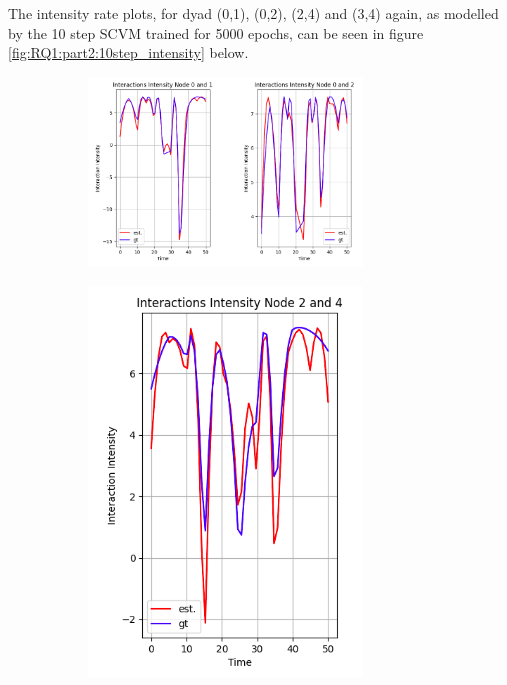 The intensity rate plots, for dyad (0,1), (0,2), (2,4) and (3,4) again, as modelled by the 10 step SCVM trained for 5000 epochs, can be seen in figure \ref{fig:RQ1:part2:10step_intensity} below.
\begin{figure}[H]
    \centering
    \begin{subfigure}[b]{0.9\textwidth}
        \centering
        \includegraphics[width=0.8\textwidth]{0_images/rq1_10step_SCVM_intensity1.png}
    \end{subfigure}
    \vfill
    \begin{subfigure}[b]{0.45\textwidth}
        \centering
        \includegraphics[width=0.8\textwidth]{0_images/rq1_10step_SCVM_intensity3.png}

\end{subfigure}
\end{figure}
